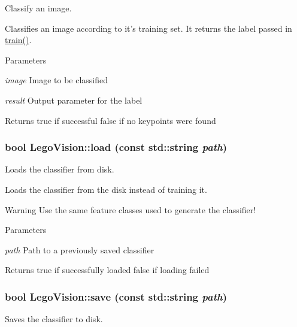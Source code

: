Classify an image. 

Classifies an image according to it's training set. It returns the label passed in \hyperlink{classLegoVision_a8ada425fb6a2c65a4de8e81bb1fc4a72}{train()}.


\begin{DoxyParams}{Parameters}
\item[{\em image}]Image to be classified \item[{\em result}]Output parameter for the label \end{DoxyParams}
\begin{DoxyReturn}{Returns}
true if successful false if no keypoints were found 
\end{DoxyReturn}
\hypertarget{classLegoVision_a60b6fdf4ad64b87c5523a2e94a17e7fd}{
\subsubsection[{load}]{\setlength{\rightskip}{0pt plus 5cm}bool LegoVision::load (const std::string {\em path})}}
\label{classLegoVision_a60b6fdf4ad64b87c5523a2e94a17e7fd}


Loads the classifier from disk. 

Loads the classifier from the disk instead of training it.

\begin{DoxyWarning}{Warning}
Use the same feature classes used to generate the classifier!
\end{DoxyWarning}

\begin{DoxyParams}{Parameters}
\item[{\em path}]Path to a previously saved classifier \end{DoxyParams}
\begin{DoxyReturn}{Returns}
true if successfully loaded false if loading failed 
\end{DoxyReturn}
\hypertarget{classLegoVision_ae1141c29fb3e96e834dddc7d36246110}{
\subsubsection[{save}]{\setlength{\rightskip}{0pt plus 5cm}bool LegoVision::save (const std::string {\em path})}}
\label{classLegoVision_ae1141c29fb3e96e834dddc7d36246110}


Saves the classifier to disk. 


